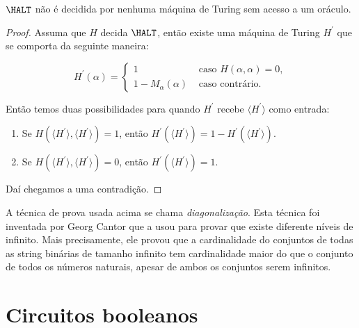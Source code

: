 \begin{teo}

$\HALT$ não é decidida por nenhuma máquina de Turing sem acesso a um oráculo.

\end{teo}

\begin{proof}

Assuma que $H$ decida $\HALT$, então existe uma máquina de Turing $H^{\prime}$ que se comporta da seguinte maneira:

\begin{equation*}
    H^{\prime}(\alpha) =
    \begin{cases}
        1 & \text{ caso } H(\alpha, \alpha) = 0, \\
        1 - M_{\alpha}(\alpha) & \text{ caso contrário}.
    \end{cases}
\end{equation*}

Então temos duas possibilidades para quando $H^{\prime}$ recebe $\langle H^{\prime} \rangle$ como entrada:

\begin{enumerate}

\item Se $H(\langle H^{\prime} \rangle, \langle H^{\prime} \rangle) = 1$, então $H^{\prime}(\langle H^{\prime} \rangle) = 1 - H^{\prime}(\langle H^{\prime} \rangle)$.

\item Se $H(\langle H^{\prime} \rangle, \langle H^{\prime} \rangle) = 0$, então $H^{\prime}(\langle H^{\prime} \rangle) = 1$.

\end{enumerate}

Daí chegamos a uma contradição.

\end{proof}

A técnica de prova usada acima se chama \emph{diagonalização}. Esta técnica foi inventada por Georg Cantor que a usou para provar que existe diferente níveis de infinito. Mais precisamente, ele provou que a cardinalidade do conjuntos de todas as string binárias de tamanho infinito tem cardinalidade maior do que o conjunto de todos os números naturais, apesar de ambos os conjuntos serem infinitos.

\section{Circuitos booleanos} \label{circuitos}

